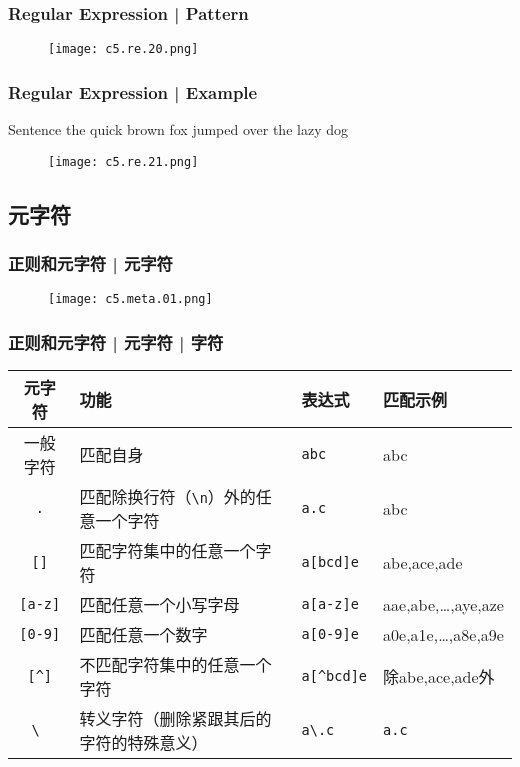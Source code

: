 \begin{frame}
  \frametitle{Regular Expression | Pattern}
  \begin{figure}
    \centering
    \texttt{[image: c5.re.20.png]}
  \end{figure}
\end{frame}

\begin{frame}
  \frametitle{Regular Expression | Example}
  \begin{block}{Sentence}
    the quick brown fox jumped over the lazy dog
  \end{block}
  \begin{figure}
    \centering
    \texttt{[image: c5.re.21.png]}
  \end{figure}
\end{frame}

\subsection{元字符}
\begin{frame}[fragile]
  \frametitle{正则和元字符 | 元字符}
  \begin{figure}
    \centering
    \texttt{[image: c5.meta.01.png]}
  \end{figure}
\end{frame}

\begin{frame}[fragile]
  \frametitle{正则和元字符 | 元字符 | \alert{字符}}
  \begin{table}
    \centering
    \begin{tabularx}{\textwidth}{cXll}
      \hline
      \rowcolor{blue!50}元字符 & 功能 & 表达式 & 匹配示例\\
      \hline
      一般字符 & 匹配自身 & \verb|abc| & abc\\
      \verb|.| & 匹配除换行符（\verb|\n|）外的任意一个字符 & \verb|a.c| & abc\\
      \verb|[]| & 匹配字符集中的任意一个字符 & \verb|a[bcd]e| & abe,ace,ade\\
      \verb|[a-z]| & 匹配任意一个小写字母 & \verb|a[a-z]e| & aae,abe,\ldots,aye,aze\\
      \verb|[0-9]| & 匹配任意一个数字 & \verb|a[0-9]e| & a0e,a1e,\ldots,a8e,a9e\\
      \verb|[^]| & 不匹配字符集中的任意一个字符 & \verb|a[^bcd]e| & 除abe,ace,ade外\\
      \verb|\ | & 转义字符（删除紧跟其后的字符的特殊意义） & \verb|a\.c| & \verb|a.c|\\
      \hline
    \end{tabularx}
  \end{table}
\end{frame}

